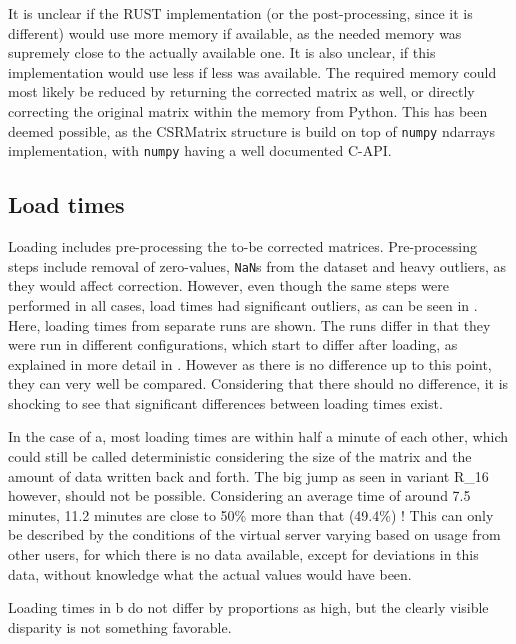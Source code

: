 It is unclear if the RUST implementation (or the post-processing, since it is
different) would use more memory if available, as the needed memory was
supremely close to the actually available one. It is also unclear, if this
implementation would use less if less was available. The required memory could
most likely be reduced by returning the corrected matrix as well, or directly
correcting the original matrix within the memory from Python. This has been
deemed possible, as the CSRMatrix structure is build on top of \verb|numpy|
ndarrays implementation, with \verb|numpy| having a well documented C-API.





\subsection{Load times}\label{sec:loadtime}



Loading includes pre-processing the to-be corrected matrices. Pre-processing
steps include removal of zero-values, \verb|NaN|s from the dataset and
heavy outliers, as they would affect correction. However, even though the same
steps were performed in all cases, load times had significant outliers, as can
be seen in . Here, loading times from separate runs are
shown. The runs differ in that they were run in different configurations, which
start to differ after loading, as explained in more detail in
. However as there is no difference up to this point,
they can very well be compared. Considering that there should no difference, it
is shocking to see that significant differences between loading times exist.

In the case of a, most loading times are within half a
minute of each other, which could still be called deterministic considering the
size of the matrix and the amount of data written back and forth. The big jump
as seen in variant R\_16 however, should not be possible. Considering an
average time of around 7.5 minutes, 11.2 minutes are close to 50\% more than
that (49.4\%) ! This can only be described by the conditions of the virtual
server varying based on usage from other users, for which there is no data
available, except for deviations in this data, without knowledge what the
actual values would have been.

Loading times in b do not differ by proportions as high,
but the clearly visible disparity is not something favorable.


